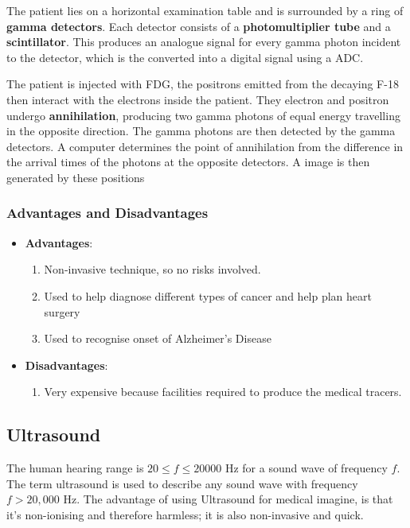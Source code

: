 The patient lies on a horizontal examination table and is surrounded by a ring of \textbf{gamma detectors}. Each detector consists of a \textbf{photomultiplier tube} and a \textbf{scintillator}. This produces an analogue signal for every gamma photon incident to the detector, which is the converted into a digital signal using a ADC. 

The patient is injected with FDG, the positrons emitted from the decaying F-18 then interact with the electrons inside the patient. They electron and positron undergo \textbf{annihilation}, producing two gamma photons of equal energy travelling in the opposite direction. The gamma photons are then detected by the gamma detectors. A computer determines the point of annihilation from the difference in the arrival times of the photons at the opposite detectors. A image is then generated by these positions

\subsubsection{Advantages and Disadvantages}
\begin{itemize}
    \item \textbf{Advantages}:
    \begin{enumerate}
        \item Non-invasive technique, so no risks involved.
        \item Used to help diagnose different types of cancer and help plan heart surgery
        \item Used to recognise onset of Alzheimer's Disease
    \end{enumerate}
    \item \textbf{Disadvantages}:
    \begin{enumerate}
        \item Very expensive because facilities required to produce the medical tracers.
    \end{enumerate}
\end{itemize}

\subsection{Ultrasound}

The human hearing range is $20 \leq f \leq 20000$ Hz for a sound wave of frequency $f$. The term ultrasound is used to describe any sound wave with frequency $f > 20,000$ Hz. The advantage of using Ultrasound for medical imagine, is that it's non-ionising and therefore harmless; it is also non-invasive and quick. 


